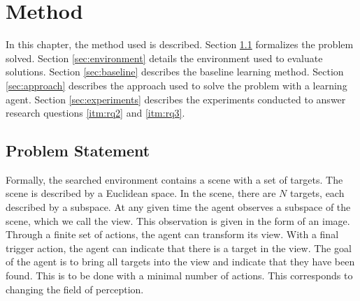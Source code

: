 \chapter{Method}
\label{cha:method}

% 

In this chapter, the method used is described.
Section \ref{sec:problem} formalizes the problem solved.
Section \ref{sec:environment} details the environment used to evaluate solutions.
Section \ref{sec:baseline} describes the baseline learning method.
Section \ref{sec:approach} describes the approach used to solve the problem with a learning agent.
Section \ref{sec:experiments} describes the experiments conducted to answer research questions \ref{itm:rq2} and \ref{itm:rq3}.

\section{Problem Statement}
\label{sec:problem}



Formally, the searched environment contains a scene with a set of targets.
The scene is described by a Euclidean space.
In the scene, there are \(N\) targets, each described by a subspace.
At any given time the agent observes a subspace of the scene, which we call the view.
This observation is given in the form of an image.
Through a finite set of actions, the agent can transform its view.
With a final trigger action, the agent can indicate that there is a target in the view.
The goal of the agent is to bring all targets into the view and indicate that they have been found.
This is to be done with a minimal number of actions.
This corresponds to changing the field of perception.

